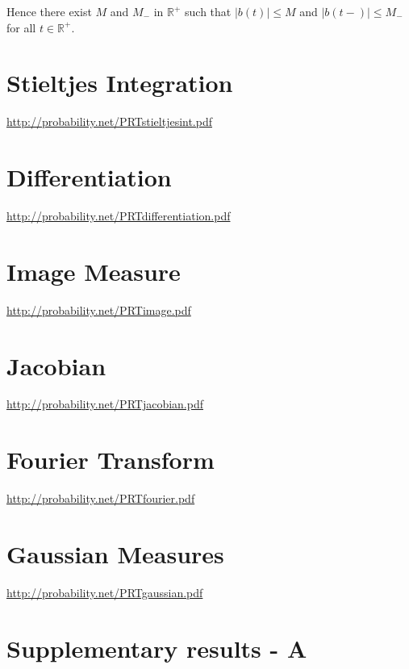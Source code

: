 \documentclass[a4paper]{article}
\newcommand{\brac}[1]{\left ( #1 \right )}
\newcommand{\abs}[1]{\left | #1 \right |}
\newcommand{\Real}{\mathbb{R}}
\begin{document}
Hence there exist $M$ and $M_-$ in $\Real^+$ such that $\abs{b\brac{t}}\leq M$ and $\abs{b\brac{t-}}\leq M_-$ for all $t\in \Real^+$.\\


\section{Stieltjes Integration} %
\label{sec:tut_15}
\url{http://probability.net/PRTstieltjesint.pdf}




\section{Differentiation} %
\label{sec:tut_16}
\url{http://probability.net/PRTdifferentiation.pdf}


\section{Image Measure} %
\label{sec:tut_17}
\url{http://probability.net/PRTimage.pdf}


\section{Jacobian} %
\label{sec:tut_18}
\url{http://probability.net/PRTjacobian.pdf}


\section{Fourier Transform} %
\label{sec:tut_19}
\url{http://probability.net/PRTfourier.pdf}


\section{Gaussian Measures} %
\label{sec:tut_20}
\url{http://probability.net/PRTgaussian.pdf}


\section{Supplementary results - A} %
\label{sec:sup_a}
\end{document}
